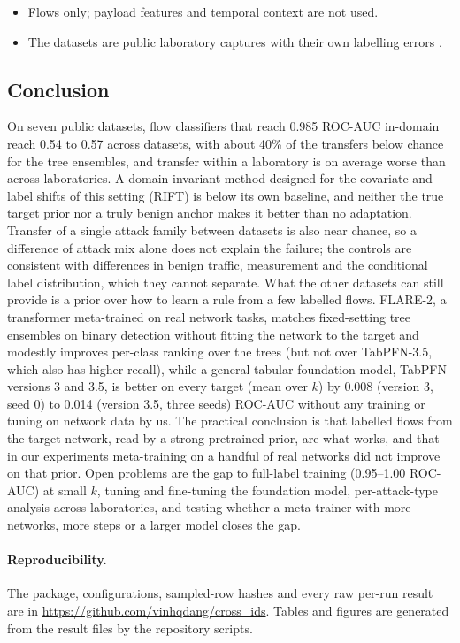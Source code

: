 \documentclass[11pt]{article}
\begin{document}
\begin{itemize}
\item Flows only; payload features and temporal context are not used.
\item The datasets are public laboratory captures with their own labelling errors \citep{engelen2021troubleshooting}.
\end{itemize}

\subsection{Conclusion}
On seven public datasets, flow classifiers that reach 0.985 ROC-AUC in-domain reach 0.54 to 0.57 across datasets, with about 40\% of the transfers below chance for the tree ensembles, and transfer within a laboratory is on average worse than across laboratories.
A domain-invariant method designed for the covariate and label shifts of this setting (RIFT) is below its own baseline, and neither the true target prior nor a truly benign anchor makes it better than no adaptation.
Transfer of a single attack family between datasets is also near chance, so a difference of attack mix alone does not explain the failure; the controls are consistent with differences in benign traffic, measurement and the conditional label distribution, which they cannot separate.
What the other datasets can still provide is a prior over how to learn a rule from a few labelled flows.
FLARE-2, a transformer meta-trained on real network tasks, matches fixed-setting tree ensembles on binary detection without fitting the network to the target and modestly improves per-class ranking over the trees (but not over TabPFN-3.5, which also has higher recall), while a general tabular foundation model, TabPFN versions 3 and 3.5, is better on every target (mean over $k$) by 0.008 (version 3, seed 0) to 0.014 (version 3.5, three seeds) ROC-AUC without any training or tuning on network data by us.
The practical conclusion is that labelled flows from the target network, read by a strong pretrained prior, are what works, and that in our experiments meta-training on a handful of real networks did not improve on that prior.
Open problems are the gap to full-label training (0.95--1.00 ROC-AUC) at small $k$, tuning and fine-tuning the foundation model, per-attack-type analysis across laboratories, and testing whether a meta-trainer with more networks, more steps or a larger model closes the gap.

\paragraph{Reproducibility.}
The package, configurations, sampled-row hashes and every raw per-run result are in \url{https://github.com/vinhqdang/cross_ids}. Tables and figures are generated from the result files by the repository scripts.



\end{document}
